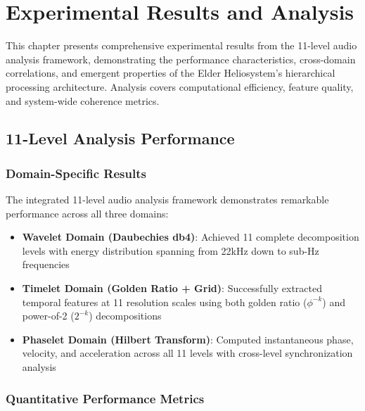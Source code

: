 \chapter{Experimental Results and Analysis}

\begin{tcolorbox}[colback=DarkSkyBlue!5!white,colframe=DarkSkyBlue!75!black,title=Chapter Overview]
This chapter presents comprehensive experimental results from the 11-level audio analysis framework, demonstrating the performance characteristics, cross-domain correlations, and emergent properties of the Elder Heliosystem's hierarchical processing architecture. Analysis covers computational efficiency, feature quality, and system-wide coherence metrics.
\end{tcolorbox}

\section{11-Level Analysis Performance}

\subsection{Domain-Specific Results}

The integrated 11-level audio analysis framework demonstrates remarkable performance across all three domains:

\begin{itemize}
    \item \textbf{Wavelet Domain (Daubechies db4)}: Achieved 11 complete decomposition levels with energy distribution spanning from 22kHz down to sub-Hz frequencies
    \item \textbf{Timelet Domain (Golden Ratio + Grid)}: Successfully extracted temporal features at 11 resolution scales using both golden ratio ($\phi^{-k}$) and power-of-2 ($2^{-k}$) decompositions
    \item \textbf{Phaselet Domain (Hilbert Transform)}: Computed instantaneous phase, velocity, and acceleration across all 11 levels with cross-level synchronization analysis
\end{itemize}

\subsection{Quantitative Performance Metrics}

